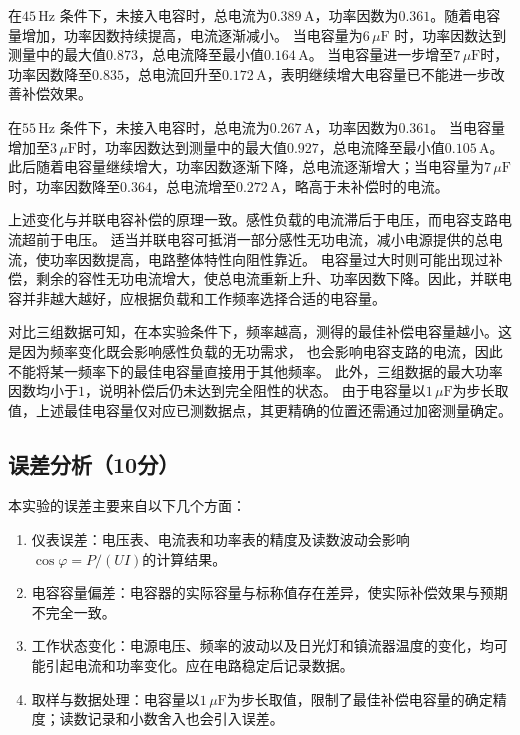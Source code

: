 \documentclass[10pt,a4paper]{ctexart} %
\begin{document}
  在$45\,\mathrm{Hz}$ 条件下，未接入电容时，总电流为$0.389\,\mathrm{A}$，功率因数为$0.361$。随着电容量增加，功率因数持续提高，电流逐渐减小。
  当电容量为$6\,\mu\mathrm{F}$ 时，功率因数达到测量中的最大值$0.873$，总电流降至最小值$0.164\,\mathrm{A}$。
  当电容量进一步增至$7\,\mu\mathrm{F}$时，功率因数降至$0.835$，总电流回升至$0.172\,\mathrm{A}$，表明继续增大电容量已不能进一步改善补偿效果。

  在$55\,\mathrm{Hz}$ 条件下，未接入电容时，总电流为$0.267\,\mathrm{A}$，功率因数为$0.361$。
  当电容量增加至$3\,\mu\mathrm{F}$时，功率因数达到测量中的最大值$0.927$，总电流降至最小值$0.105\,\mathrm{A}$。
  此后随着电容量继续增大，功率因数逐渐下降，总电流逐渐增大；当电容量为$7\,\mu\mathrm{F}$时，功率因数降至$0.364$，总电流增至$0.272\,\mathrm{A}$，略高于未补偿时的电流。

  上述变化与并联电容补偿的原理一致。感性负载的电流滞后于电压，而电容支路电流超前于电压。
  适当并联电容可抵消一部分感性无功电流，减小电源提供的总电流，使功率因数提高，电路整体特性向阻性靠近。
  电容量过大时则可能出现过补偿，剩余的容性无功电流增大，使总电流重新上升、功率因数下降。因此，并联电容并非越大越好，应根据负载和工作频率选择合适的电容量。

  对比三组数据可知，在本实验条件下，频率越高，测得的最佳补偿电容量越小。这是因为频率变化既会影响感性负载的无功需求，
  也会影响电容支路的电流，因此不能将某一频率下的最佳电容量直接用于其他频率。
  此外，三组数据的最大功率因数均小于$1$，说明补偿后仍未达到完全阻性的状态。
  由于电容量以$1\,\mu\mathrm{F}$为步长取值，上述最佳电容量仅对应已测数据点，其更精确的位置还需通过加密测量确定。

  \subsection{误差分析（10分）}
  本实验的误差主要来自以下几个方面：
  \begin{enumerate}
    \item 仪表误差：电压表、电流表和功率表的精度及读数波动会影响$\cos\varphi=P/(UI)$的计算结果。
    \item 电容容量偏差：电容器的实际容量与标称值存在差异，使实际补偿效果与预期不完全一致。
    \item 工作状态变化：电源电压、频率的波动以及日光灯和镇流器温度的变化，均可能引起电流和功率变化。应在电路稳定后记录数据。
    \item 取样与数据处理：电容量以$1\,\mu\mathrm{F}$为步长取值，限制了最佳补偿电容量的确定精度；读数记录和小数舍入也会引入误差。
  \end{enumerate}
\end{document}
